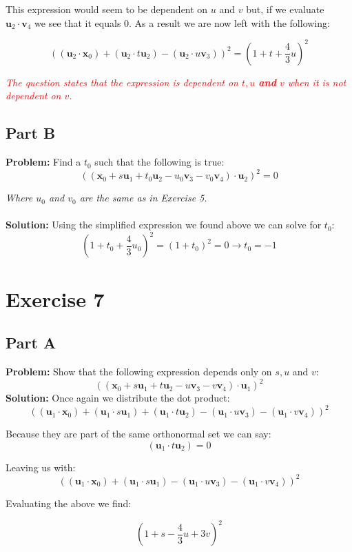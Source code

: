 \documentclass{article}
\begin{document}
This expression would seem to be dependent on $u$ and $v$ but, if we evaluate $\mathbf u_2\cdot \mathbf v_4$ we see that it equals 0. As a result we are now left with the following:

$$((\mathbf u_2\cdot\mathbf x_0)+(\mathbf u_2\cdot t\mathbf u_2)-(\mathbf u_2\cdot u\mathbf v_3))^2=\left(1+t+\frac{4}{3}u\right)^2$$

\textit{\textcolor{red}{The question states that the expression is dependent on $t,u$ \textbf{and} $v$ when it is not dependent on $v$.}}

\subsection*{Part B}
\textbf{Problem:} Find a $t_0$ such that the following is true:
$$((\mathbf x_0+s\mathbf u_1+t_0\mathbf u_2-u_0\mathbf v_3-v_0\mathbf v_4)\cdot\mathbf u_2)^2=0$$

\textit{Where $u_0$ and $v_0$ are the same as in Exercise 5.}
\\\\
\textbf{Solution:} Using the simplified expression we found above we can solve for $t_0$:
$$\left(1+t_0+\frac{4}{3}u_0\right)^2=(1+t_0)^2=0\rightarrow \boxed{t_0=-1}$$

\section*{Exercise 7}
\subsection*{Part A}
\textbf{Problem:} Show that the following expression depends only on $s,u$ and $v$:
$$((\mathbf x_0+s\mathbf u_1+t\mathbf u_2-u\mathbf v_3-v\mathbf v_4)\cdot\mathbf u_1)^2$$
\textbf{Solution:} Once again we distribute the dot product:
$$((\mathbf u_1\cdot\mathbf x_0)+(\mathbf u_1\cdot s\mathbf u_1)+(\mathbf u_1\cdot t\mathbf u_2)-(\mathbf u_1\cdot u\mathbf v_3)-(\mathbf u_1\cdot v\mathbf v_4))^2$$

Because they are part of the same orthonormal set we can say:
$$(\mathbf u_1\cdot t\mathbf u_2)=0$$

Leaving us with:
$$((\mathbf u_1\cdot\mathbf x_0)+(\mathbf u_1\cdot s\mathbf u_1)-(\mathbf u_1\cdot u\mathbf v_3)-(\mathbf u_1\cdot v\mathbf v_4))^2$$

Evaluating the above we find:

$$\left(1+s-\frac{4}{3}u+3v\right)^2$$
\end{document}
